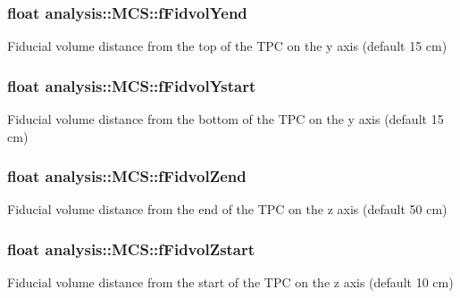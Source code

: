 \subsubsection[{\texorpdfstring{f\+Fidvol\+Yend}{fFidvolYend}}]{\setlength{\rightskip}{0pt plus 5cm}float analysis\+::\+M\+C\+S\+::f\+Fidvol\+Yend\hspace{0.3cm}{\ttfamily [private]}}\hypertarget{classanalysis_1_1MCS_af47987606cbc3ead8c1d88df48d49288}{}\label{classanalysis_1_1MCS_af47987606cbc3ead8c1d88df48d49288}
Fiducial volume distance from the top of the T\+PC on the y axis (default 15 cm) 
\subsubsection[{\texorpdfstring{f\+Fidvol\+Ystart}{fFidvolYstart}}]{\setlength{\rightskip}{0pt plus 5cm}float analysis\+::\+M\+C\+S\+::f\+Fidvol\+Ystart\hspace{0.3cm}{\ttfamily [private]}}\hypertarget{classanalysis_1_1MCS_aba2786d9cf1c4d8d7e0c3bd28d673cf5}{}\label{classanalysis_1_1MCS_aba2786d9cf1c4d8d7e0c3bd28d673cf5}
Fiducial volume distance from the bottom of the T\+PC on the y axis (default 15 cm) 
\subsubsection[{\texorpdfstring{f\+Fidvol\+Zend}{fFidvolZend}}]{\setlength{\rightskip}{0pt plus 5cm}float analysis\+::\+M\+C\+S\+::f\+Fidvol\+Zend\hspace{0.3cm}{\ttfamily [private]}}\hypertarget{classanalysis_1_1MCS_a0f37e28d875d79342f586fb9de8be014}{}\label{classanalysis_1_1MCS_a0f37e28d875d79342f586fb9de8be014}
Fiducial volume distance from the end of the T\+PC on the z axis (default 50 cm) 
\subsubsection[{\texorpdfstring{f\+Fidvol\+Zstart}{fFidvolZstart}}]{\setlength{\rightskip}{0pt plus 5cm}float analysis\+::\+M\+C\+S\+::f\+Fidvol\+Zstart\hspace{0.3cm}{\ttfamily [private]}}\hypertarget{classanalysis_1_1MCS_a481348700b446db82180ca87424dfff5}{}\label{classanalysis_1_1MCS_a481348700b446db82180ca87424dfff5}
Fiducial volume distance from the start of the T\+PC on the z axis (default 10 cm) 
